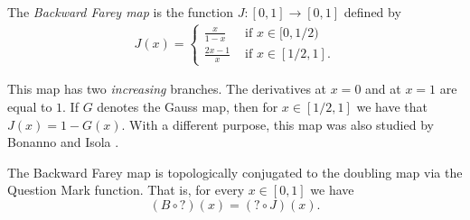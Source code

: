 \documentclass[letterpaper,10pt,reqno]{amsart}
\numberwithin{equation}{section}     %
\begin{document}
\begin{definition}
The \emph{Backward Farey map} is the function $J:[0,1] \to [0,1]$ defined by
\begin{eqnarray*}
J(x)=
\begin{cases}
\frac{x}{1-x} & \text{ if } x \in [0,1/2) \\
\frac{2x-1}{x}  & \text{ if } x \in [1/2, 1].
\end{cases}
\end{eqnarray*}
\end{definition}

\begin{remark}
This map has two \emph{increasing} branches. The derivatives at $x=0$ and at $x=1$ are equal to $1$. If $G$ denotes the Gauss map, then for $x \in [1/2, 1]$ we have that $J(x)= 1- G(x)$. With a different purpose, this map was also studied by Bonanno and Isola \cite{bi}.
\end{remark}
%

\begin{proposition}
The Backward Farey map is topologically conjugated to the doubling map via {{}{the}} Question Mark function. That is, for every $x \in [0,1]$ we have
\begin{equation*}
(B \circ ?)(x)=(? \circ J)(x).
\end{equation*}
\end{proposition}
\end{document}
